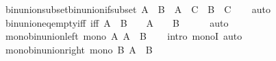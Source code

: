 \begin{isabellebody}
\isanewline
{}\isamarkupfalse%
\ bin{\isacharunderscore}{\kern0pt}union{\isacharunderscore}{\kern0pt}subset{\isacharunderscore}{\kern0pt}bin{\isacharunderscore}{\kern0pt}union{\isacharunderscore}{\kern0pt}if{\isacharunderscore}{\kern0pt}subset{\isacharprime}{\kern0pt}{\isacharcolon}{\kern0pt}\ {\isachardoublequoteopen}A\ {\isasymsubseteq}\ B\ {\isasymLongrightarrow}\ A\ {\isasymunion}\ C\ {\isasymsubseteq}\ B\ {\isasymunion}\ C{\isachardoublequoteclose}\isanewline
%
\isadelimproof
\ \ %
\endisadelimproof
%
\isatagproof
{}\isamarkupfalse%
\ auto%
\endisatagproof
{\isafoldproof}%
%
\isadelimproof
\isanewline
%
\endisadelimproof
\isanewline
{}\isamarkupfalse%
\ bin{\isacharunderscore}{\kern0pt}union{\isacharunderscore}{\kern0pt}eq{\isacharunderscore}{\kern0pt}empty{\isacharunderscore}{\kern0pt}iff\ {\isacharbrackleft}{\kern0pt}iff{\isacharbrackright}{\kern0pt}{\isacharcolon}{\kern0pt}\ {\isachardoublequoteopen}{\isacharparenleft}{\kern0pt}A\ {\isasymunion}\ B\ {\isacharequal}{\kern0pt}\ {\isacharbraceleft}{\kern0pt}{\isacharbraceright}{\kern0pt}{\isacharparenright}{\kern0pt}\ {\isasymlongleftrightarrow}\ {\isacharparenleft}{\kern0pt}A\ {\isacharequal}{\kern0pt}\ {\isacharbraceleft}{\kern0pt}{\isacharbraceright}{\kern0pt}\ {\isasymand}\ B\ {\isacharequal}{\kern0pt}\ {\isacharbraceleft}{\kern0pt}{\isacharbraceright}{\kern0pt}{\isacharparenright}{\kern0pt}{\isachardoublequoteclose}\isanewline
%
\isadelimproof
\ \ %
\endisadelimproof
%
\isatagproof
{}\isamarkupfalse%
\ auto%
\endisatagproof
{\isafoldproof}%
%
\isadelimproof
\isanewline
%
\endisadelimproof
\isanewline
{}\isamarkupfalse%
\ mono{\isacharunderscore}{\kern0pt}bin{\isacharunderscore}{\kern0pt}union{\isacharunderscore}{\kern0pt}left{\isacharcolon}{\kern0pt}\ {\isachardoublequoteopen}mono\ {\isacharparenleft}{\kern0pt}{\isasymlambda}A{\isachardot}{\kern0pt}\ A\ {\isasymunion}\ B{\isacharparenright}{\kern0pt}{\isachardoublequoteclose}\isanewline
%
\isadelimproof
\ \ %
\endisadelimproof
%
\isatagproof
{}\isamarkupfalse%
\ {\isacharparenleft}{\kern0pt}intro\ monoI{\isacharparenright}{\kern0pt}\ auto%
\endisatagproof
{\isafoldproof}%
%
\isadelimproof
\isanewline
%
\endisadelimproof
\isanewline
{}\isamarkupfalse%
\ mono{\isacharunderscore}{\kern0pt}bin{\isacharunderscore}{\kern0pt}union{\isacharunderscore}{\kern0pt}right{\isacharcolon}{\kern0pt}\ {\isachardoublequoteopen}mono\ {\isacharparenleft}{\kern0pt}{\isasymlambda}B{\isachardot}{\kern0pt}\ A\ {\isasymunion}\ B{\isacharparenright}{\kern0pt}{\isachardoublequoteclose}\isanewline

\end{isabellebody}
